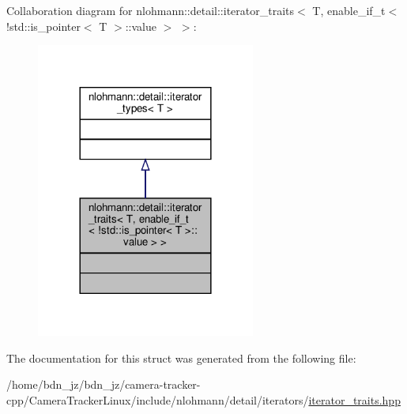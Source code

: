 Collaboration diagram for nlohmann\+:\+:detail\+:\+:iterator\+\_\+traits$<$ T, enable\+\_\+if\+\_\+t$<$ !std\+:\+:is\+\_\+pointer$<$ T $>$\+:\+:value $>$ $>$\+:\nopagebreak
\begin{figure}[H]
\begin{center}
\leavevmode
\includegraphics[width=204pt]{structnlohmann_1_1detail_1_1iterator__traits_3_01_t_00_01enable__if__t_3_01_9std_1_1is__pointer_1302cf9c02d359663610c9d693381144}
\end{center}
\end{figure}


The documentation for this struct was generated from the following file\+:\begin{DoxyCompactItemize}
\item 
/home/bdn\+\_\+jz/bdn\+\_\+jz/camera-\/tracker-\/cpp/\+Camera\+Tracker\+Linux/include/nlohmann/detail/iterators/\hyperlink{iterator__traits_8hpp}{iterator\+\_\+traits.\+hpp}\end{DoxyCompactItemize}
